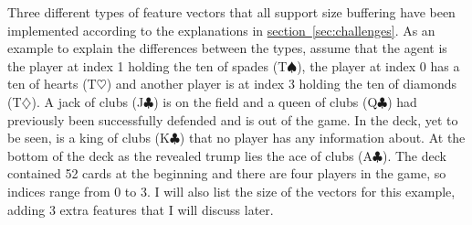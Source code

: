 \documentclass[a4paper,titlepage]{article}
\begin{document}
Three %
different types of feature vectors that all support size buffering have been implemented according to the explanations in \hyperref[sec:challenges]{section~\ref*{sec:challenges}}.
As an example to explain the differences between the types, assume that the agent is the player at index 1 holding the ten of spades (T$\spadesuit$), the player at index 0 has a ten of hearts (T$\heartsuit$) and another player is at index 3 holding the ten of diamonds (T$\diamondsuit$). A jack of clubs (J$\clubsuit$) is on the field and a queen of clubs (Q$\clubsuit$) had previously been successfully defended and is out of the game. In the deck, yet to be seen, is a king of clubs (K$\clubsuit$) that no player has any information about. At the bottom of the deck as the revealed trump lies the ace of clubs (A$\clubsuit$). The deck contained 52 cards at the beginning and there are four players in the game, so indices range from 0 to 3. I will also list the size of the vectors for this example, adding 3 extra features that I will discuss later.
\end{document}
